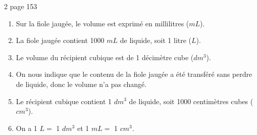 \begin{myact}{2 page 153}
	\begin{enumerate}
		\item Sur la fiole jaugée, le volume est exprimé en millilitres ($mL$). \pause
		\item La fiole jaugée contient \num{1000} $mL$ de liquide, soit 1 litre ($L$). \pause
		\item Le volume du récipient cubique est de 1 décimètre cube ($dm^3$). \pause
		\item On nous indique que le contenu de la fiole jaugée a été transféré sans perdre de liquide, donc le volume n'a pas changé.\pause
		\item Le récipient cubique contient 1 $dm^3$ de liquide, soit \num{1000} centimètres cubes ($cm^3$).\pause
		\item On a 1 $L =$ 1 $dm^3$ et 1 $mL = $ 1 $cm^3$.
	\end{enumerate}
\end{myact}